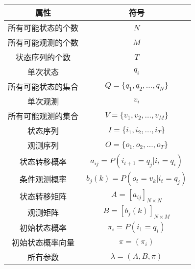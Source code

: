 \documentclass[a4paper,12pt]{ctexart}     %
\begin{document}
	
	\begin{center}
		\begin{longtable}{cc} %
				\toprule    
				属性 & 符号  \\    
				\midrule 
				所有可能状态的个数 &$ N $ \\
				所有可能观测的个数 & $ M $ \\ 
				状态序列的个数 & $ T $  \\   
				单次状态 & $q_i$ \\ 
				所有可能状态的集合 & $ Q = \{ q_1,q_2,\dots,q_N\} $  \\
				单次观测 & $ v_i $  \\ 
				所有可能观测的集合 & $ V = \{ v_1,v_2,\dots,v_M\} $  \\
				状态序列 & $ I = \{i_1,i_2,\dots,i_T\} $  \\
				观测序列 & $ O = \{ o_1,o_2,\dots,o_T\} $ \\
				状态转移概率 & $ a_{ij} = P(i_{t+1} = q_j | i_t = q_i) $ \\
				条件观测概率 & $ b_j(k) = P(o_t = v_k| i_t = q_j)$ \\ 
				状态转移矩阵 & $ A = [a_{ij} ]_{N \times N} $ \\
				观测矩阵 & $ B = [b_j(k)]_{N \times M} $ \\
				初始状态概率 & $ \pi_i = P(i_1 = q_i)$ \\
				初始状态概率向量 & $ \pi = (\pi_i) $ \\
				所有参数 & $ \lambda = (A,B,\pi) $\\  
				\bottomrule   	
\end{longtable}

	\end{center}
\end{document}

